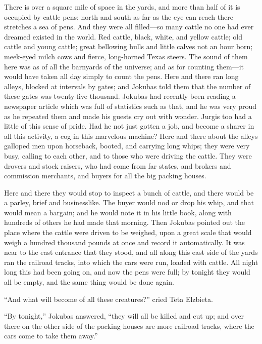 \documentclass[
]{article}
\begin{document}
There is over a square mile of space in the yards, and more than half of it is occupied by cattle pens; north and south as far as the eye can reach there stretches a sea of pens. And they were all filled---so many cattle no one had ever dreamed existed in the world. Red cattle, black, white, and yellow cattle; old cattle and young cattle; great bellowing bulls and little calves not an hour born; meek-eyed milch cows and fierce, long-horned Texas steers. The sound of them here was as of all the barnyards of the universe; and as for counting them---it would have taken all day simply to count the pens. Here and there ran long alleys, blocked at intervals by gates; and Jokubas told them that the number of these gates was twenty-five thousand. Jokubas had recently been reading a newspaper article which was full of statistics such as that, and he was very proud as he repeated them and made his guests cry out with wonder. Jurgis too had a little of this sense of pride. Had he not just gotten a job, and become a sharer in all this activity, a cog in this marvelous machine? Here and there about the alleys galloped men upon horseback, booted, and carrying long whips; they were very busy, calling to each other, and to those who were driving the cattle. They were drovers and stock raisers, who had come from far states, and brokers and commission merchants, and buyers for all the big packing houses.

Here and there they would stop to inspect a bunch of cattle, and there would be a parley, brief and businesslike. The buyer would nod or drop his whip, and that would mean a bargain; and he would note it in his little book, along with hundreds of others he had made that morning. Then Jokubas pointed out the place where the cattle were driven to be weighed, upon a great scale that would weigh a hundred thousand pounds at once and record it automatically. It was near to the east entrance that they stood, and all along this east side of the yards ran the railroad tracks, into which the cars were run, loaded with cattle. All night long this had been going on, and now the pens were full; by tonight they would all be empty, and the same thing would be done again.

``And what will become of all these creatures?'' cried Teta Elzbieta.

``By tonight,'' Jokubas answered, ``they will all be killed and cut up; and over there on the other side of the packing houses are more railroad tracks, where the cars come to take them away.''
\end{document}

